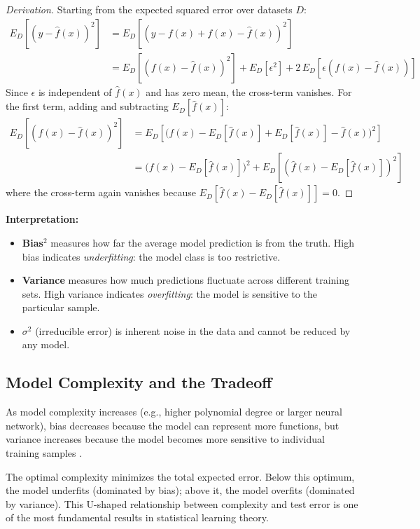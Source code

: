 \documentclass[12pt, a4paper]{article}
\begin{document}
\begin{proof}[Derivation]
Starting from the expected squared error over datasets $D$:
\begin{align*}
E_D[(y - \hat{f}(x))^2]
&= E_D[(y - f(x) + f(x) - \hat{f}(x))^2] \\
&= E_D[(f(x) - \hat{f}(x))^2] + E_D[\epsilon^2] + 2\,E_D[\epsilon(f(x) - \hat{f}(x))]
\end{align*}
Since $\epsilon$ is independent of $\hat{f}(x)$ and has zero mean, the cross-term vanishes.
For the first term, adding and subtracting $E_D[\hat{f}(x)]$:
\begin{align*}
E_D[(f(x) - \hat{f}(x))^2]
&= E_D\left[\bigl(f(x) - E_D[\hat{f}(x)] + E_D[\hat{f}(x)] - \hat{f}(x)\bigr)^2\right] \\
&= \bigl(f(x) - E_D[\hat{f}(x)]\bigr)^2 + E_D\left[(\hat{f}(x) - E_D[\hat{f}(x)])^2\right]
\end{align*}
where the cross-term again vanishes because $E_D[\hat{f}(x) - E_D[\hat{f}(x)]] = 0$.
\end{proof}

\textbf{Interpretation:}
\begin{itemize}
    \item \textbf{Bias$^2$} measures how far the average model prediction is from the truth.
          High bias indicates \emph{underfitting}: the model class is too restrictive.
    \item \textbf{Variance} measures how much predictions fluctuate across different training
          sets. High variance indicates \emph{overfitting}: the model is sensitive to the
          particular sample.
    \item \textbf{$\sigma^2$} (irreducible error) is inherent noise in the data and cannot be
          reduced by any model.
\end{itemize}

\subsection{Model Complexity and the Tradeoff}

As model complexity increases (e.g., higher polynomial degree or larger neural network),
bias decreases because the model can represent more functions, but variance increases
because the model becomes more sensitive to individual training samples
\citep{hastie2009elements}.

The optimal complexity minimizes the total expected error. Below this optimum, the model
underfits (dominated by bias); above it, the model overfits (dominated by variance).
This U-shaped relationship between complexity and test error is one of the most
fundamental results in statistical learning theory.
\end{document}
